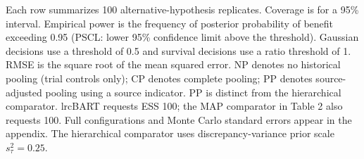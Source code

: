 \noindent\begin{minipage}{\linewidth}\footnotesize Each row summarizes 100 alternative-hypothesis replicates. Coverage is for a 95\% interval. Empirical power is the frequency of posterior probability of benefit exceeding 0.95 (PSCL: lower 95\% confidence limit above the threshold). Gaussian decisions use a threshold of 0.5 and survival decisions use a ratio threshold of 1. RMSE is the square root of the mean squared error. NP denotes no historical pooling (trial controls only); CP denotes complete pooling; PP denotes source-adjusted pooling using a source indicator. PP is distinct from the hierarchical comparator. lrcBART requests ESS 100; the MAP comparator in Table 2 also requests 100. Full configurations and Monte Carlo standard errors appear in the appendix. The hierarchical comparator uses discrepancy-variance prior scale $s_\tau^2=0.25$.\end{minipage}
\endgroup
